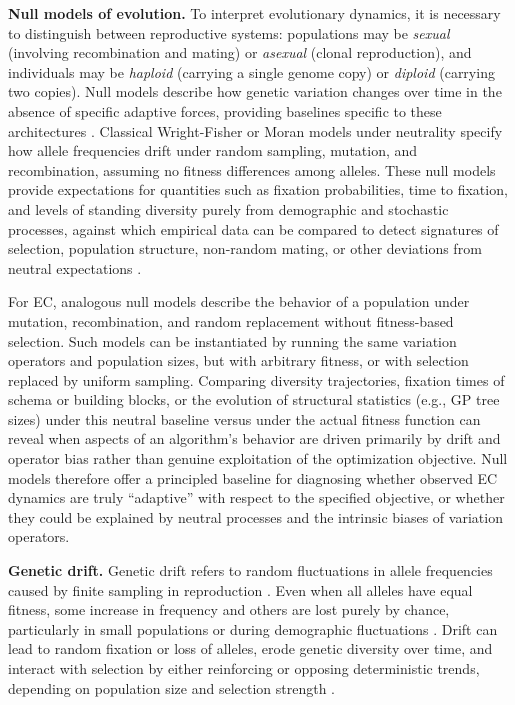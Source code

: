 \textbf{Null models of evolution.}
To interpret evolutionary dynamics, it is necessary to distinguish between reproductive systems: populations may be \textit{sexual} (involving recombination and mating) or \textit{asexual} (clonal reproduction), and individuals may be \textit{haploid} (carrying a single genome copy) or \textit{diploid} (carrying two copies).
Null models describe how genetic variation changes over time in the absence of specific adaptive forces, providing baselines specific to these architectures \citep{hamilton2021population}.
Classical Wright-Fisher \citep{wright1931evolution, fisher1930genetical} or Moran \citep{moran1958random} models under neutrality specify how allele frequencies drift under random sampling, mutation, and recombination, assuming no fitness differences among alleles.
These null models provide expectations for quantities such as fixation probabilities, time to fixation, and levels of standing diversity purely from demographic and stochastic processes, against which empirical data can be compared to detect signatures of selection, population structure, non-random mating, or other deviations from neutral expectations \citep{kimura1985neutral, hartl1997principles}.

For EC, analogous null models describe the behavior of a population under mutation, recombination, and random replacement without fitness-based selection.
Such models can be instantiated by running the same variation operators and population sizes, but with arbitrary fitness, or with selection replaced by uniform sampling.
Comparing diversity trajectories, fixation times of schema or building blocks, or the evolution of structural statistics (e.g., GP tree sizes) under this neutral baseline versus under the actual fitness function can reveal when aspects of an algorithm's behavior are driven primarily by drift and operator bias rather than genuine exploitation of the optimization objective.
Null models therefore offer a principled baseline for diagnosing whether observed EC dynamics are truly ``adaptive'' with respect to the specified objective, or whether they could be explained by neutral processes and the intrinsic biases of variation operators.

\textbf{Genetic drift.}
Genetic drift refers to random fluctuations in allele frequencies caused by finite sampling in reproduction \citep{kimura1985neutral}.
Even when all alleles have equal fitness, some increase in frequency and others are lost purely by chance, particularly in small populations or during demographic fluctuations \citep{lynch2016genetic, kimura1985neutral, ohta1992nearly}.
Drift can lead to random fixation or loss of alleles, erode genetic diversity over time, and interact with selection by either reinforcing or opposing deterministic trends, depending on population size and selection strength \citep{hamilton2021population}.

